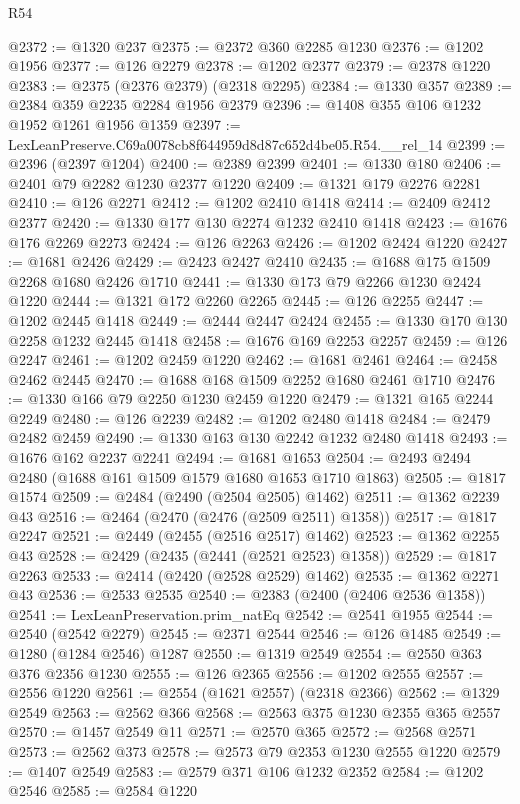 \begin{lexlean}{R54}
\begin{coremodule}
@2372 := @1320 @237
@2375 := @2372 @360 @2285 @1230
@2376 := @1202 @1956
@2377 := @126 @2279
@2378 := @1202 @2377
@2379 := @2378 @1220
@2383 := @2375 (@2376 @2379) (@2318 @2295)
@2384 := @1330 @357
@2389 := @2384 @359 @2235 @2284 @1956 @2379
@2396 := @1408 @355 @106 @1232 @1952 @1261 @1956 @1359
@2397 := LexLeanPreserve.C69a0078cb8f644959d8d87c652d4be05.R54.__rel_14
@2399 := @2396 (@2397 @1204)
@2400 := @2389 @2399
@2401 := @1330 @180
@2406 := @2401 @79 @2282 @1230 @2377 @1220
@2409 := @1321 @179 @2276 @2281
@2410 := @126 @2271
@2412 := @1202 @2410 @1418
@2414 := @2409 @2412 @2377
@2420 := @1330 @177 @130 @2274 @1232 @2410 @1418
@2423 := @1676 @176 @2269 @2273
@2424 := @126 @2263
@2426 := @1202 @2424 @1220
@2427 := @1681 @2426
@2429 := @2423 @2427 @2410
@2435 := @1688 @175 @1509 @2268 @1680 @2426 @1710
@2441 := @1330 @173 @79 @2266 @1230 @2424 @1220
@2444 := @1321 @172 @2260 @2265
@2445 := @126 @2255
@2447 := @1202 @2445 @1418
@2449 := @2444 @2447 @2424
@2455 := @1330 @170 @130 @2258 @1232 @2445 @1418
@2458 := @1676 @169 @2253 @2257
@2459 := @126 @2247
@2461 := @1202 @2459 @1220
@2462 := @1681 @2461
@2464 := @2458 @2462 @2445
@2470 := @1688 @168 @1509 @2252 @1680 @2461 @1710
@2476 := @1330 @166 @79 @2250 @1230 @2459 @1220
@2479 := @1321 @165 @2244 @2249
@2480 := @126 @2239
@2482 := @1202 @2480 @1418
@2484 := @2479 @2482 @2459
@2490 := @1330 @163 @130 @2242 @1232 @2480 @1418
@2493 := @1676 @162 @2237 @2241
@2494 := @1681 @1653
@2504 := @2493 @2494 @2480 (@1688 @161 @1509 @1579 @1680 @1653 @1710 @1863)
@2505 := @1817 @1574
@2509 := @2484 (@2490 (@2504 @2505) @1462)
@2511 := @1362 @2239 @43
@2516 := @2464 (@2470 (@2476 (@2509 @2511) @1358))
@2517 := @1817 @2247
@2521 := @2449 (@2455 (@2516 @2517) @1462)
@2523 := @1362 @2255 @43
@2528 := @2429 (@2435 (@2441 (@2521 @2523) @1358))
@2529 := @1817 @2263
@2533 := @2414 (@2420 (@2528 @2529) @1462)
@2535 := @1362 @2271 @43
@2536 := @2533 @2535
@2540 := @2383 (@2400 (@2406 @2536 @1358))
@2541 := LexLeanPreservation.prim_natEq
@2542 := @2541 @1955
@2544 := @2540 (@2542 @2279)
@2545 := @2371 @2544
@2546 := @126 @1485
@2549 := @1280 (@1284 @2546) @1287
@2550 := @1319 @2549
@2554 := @2550 @363 @376 @2356 @1230
@2555 := @126 @2365
@2556 := @1202 @2555
@2557 := @2556 @1220
@2561 := @2554 (@1621 @2557) (@2318 @2366)
@2562 := @1329 @2549
@2563 := @2562 @366
@2568 := @2563 @375 @1230 @2355 @365 @2557
@2570 := @1457 @2549 @11
@2571 := @2570 @365
@2572 := @2568 @2571
@2573 := @2562 @373
@2578 := @2573 @79 @2353 @1230 @2555 @1220
@2579 := @1407 @2549
@2583 := @2579 @371 @106 @1232 @2352
@2584 := @1202 @2546
@2585 := @2584 @1220

\end{coremodule}
\end{lexlean}
